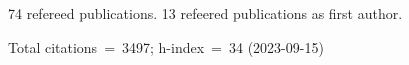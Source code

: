 74 refereed publications. 13 refeered publications as first author.

Total citations~=~3497; h-index~=~34 (2023-09-15)